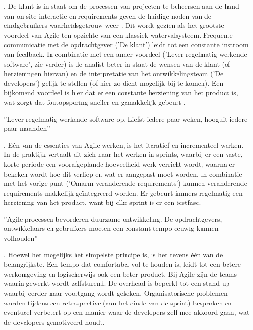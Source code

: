  \autocite{Beck2001}. De klant is in staat om de processen van projecten te beheersen  aan de hand van on-site interactie en requirements geven de huidige noden van de eindgebruikers waarheidsgetrouw weer \autocite{Kumar2012}. Dit wordt gezien als het grootste voordeel van Agile ten opzichte van een klassiek watervalsysteem. Frequente communicatie met de opdrachtgever ('De klant') leidt tot een constante instroom van feedback. In combinatie met een ander voordeel ('Lever regelmatig werkende software', zie verder) is de analist beter in staat de wensen van de klant (of herzieningen hiervan) en de interpretatie van het ontwikkelingsteam ('De developers') gelijk te stellen (of hier zo dicht mogelijk bij te komen). Een bijkomend voordeel is hier dat er een constante herziening van het product is, wat zorgt dat foutopsporing sneller en gemakkelijk gebeurt \autocite{Imreh2011}.

''Lever regelmatig werkende software op. Liefst iedere paar weken, hooguit iedere paar maanden''

\autocite{Beck2001}. Eén van de essenties van Agile werken, is het iteratief en incrementeel werken. In de praktijk vertaalt dit zich naar het werken in sprints, waarbij er een vaste, korte periode een voorafgeplande hoeveelheid werk verricht wordt, waarna er bekeken wordt hoe dit verliep en wat er aangepast moet worden. In combinatie met het vorige punt ('Omarm veranderende requirements') kunnen veranderende requirements makkelijk geïntegreerd worden. Er gebeurt immers regelmatig een herziening van het product, want bij elke sprint is er een testfase.


''Agile processen bevorderen duurzame ontwikkeling. De opdrachtgevers, ontwikkelaars en gebruikers moeten een constant tempo eeuwig kunnen volhouden''

\autocite{Beck2001}. Hoewel het mogelijks het simpelste principe is, is het tevens één van de belangrijkste. Een tempo dat comfortabel vol te houden is, leidt tot een betere werkomgeving en logischerwijs ook een beter product. Bij Agile zijn de teams waarin gewerkt wordt zelfsturend. De overhead is beperkt tot een stand-up waarbij eerder naar voortgang wordt gekeken. Organisatorische problemen worden tijdens een retrospective (aan het einde van de sprint) besproken en eventueel verbetert op een manier waar de developers zelf mee akkoord gaan, wat de developers gemotiveerd houdt.

